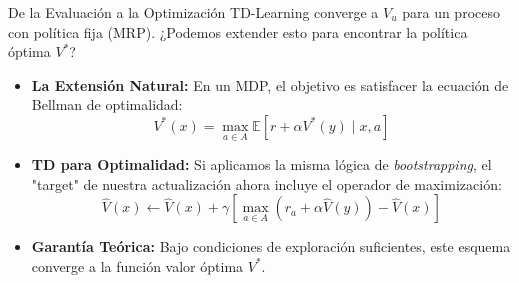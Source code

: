 \documentclass[xcolor=dvipsnames, handout]{beamer}
\begin{document}
\begin{frame}{De la Evaluaci\'on a la Optimizaci\'on}
TD-Learning converge a $V_u$ para un proceso con política fija (MRP). ¿Podemos extender esto para encontrar la política óptima $V^*$?

\begin{itemize}
    \item<2-> \textbf{La Extensi\'on Natural:} En un MDP, el objetivo es satisfacer la ecuaci\'on de Bellman de optimalidad:
    \[ V^*(x) = \max_{a \in A} \mathbb{E} [r + \alpha V^*(y) \mid x, a] \]
    
    \item<3-> \textbf{TD para Optimalidad:} Si aplicamos la misma lógica de \textit{bootstrapping}, el "target" de nuestra actualización ahora incluye el operador de maximización:
    \[ \hat{V}(x) \leftarrow \hat{V}(x) + \gamma \left[ \max_{a \in A} (r_a + \alpha \hat{V}(y)) - \hat{V}(x) \right] \]
    
    \item<4-> \textbf{Garant\'ia Te\'orica:} Bajo condiciones de exploración suficientes, este esquema converge a la funci\'on valor óptima $V^*$.
\end{itemize}

\end{frame}
\end{document}
